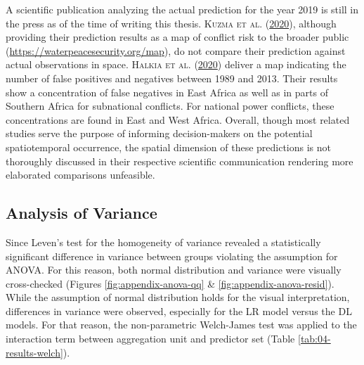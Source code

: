 \documentclass[a4paper,11pt]{article}
\begin{document}
A scientific publication analyzing the actual prediction for the year 2019 is still in the press as of the time
of writing this thesis. \textsc{\textnormal{Kuzma} \textnormal{et al.}} \textsc{(\textnormal{\protect\hyperlink{ref-kuzma2020}{2020}})}, although providing their prediction results
as a map of conflict risk to the broader public (\url{https://waterpeacesecurity.org/map}),
do not compare their prediction against actual observations in space.
\textsc{\textnormal{Halkia} \textnormal{et al.}} \textsc{(\textnormal{\protect\hyperlink{ref-halkia2020a}{2020}})} deliver a map indicating the number of false positives and negatives
between 1989 and 2013. Their results show a concentration of false negatives in
East Africa as well as in parts of Southern Africa for subnational conflicts.
For national power conflicts, these concentrations are found in East and West Africa.
Overall, though most related studies serve the purpose of informing decision-makers
on the potential spatiotemporal occurrence, the spatial dimension of these predictions
is not thoroughly discussed in their respective scientific communication rendering
more elaborated comparisons unfeasible.

\hypertarget{analysis-of-variance-1}{%
\subsection{Analysis of Variance}\label{analysis-of-variance-1}}

Since Leven's test for the homogeneity of variance revealed a statistically
significant difference in variance between groups violating the assumption for
ANOVA. For this reason, both normal distribution and variance were visually
cross-checked (Figures \ref{fig:appendix-anova-qq} \& \ref{fig:appendix-anova-resid}).
While the assumption of normal distribution holds for the visual interpretation,
differences in variance were observed, especially for the LR model versus the DL
models. For that reason, the non-parametric Welch-James test was applied to the
interaction term between aggregation unit and predictor set (Table \ref{tab:04-results-welch}).
\end{document}

